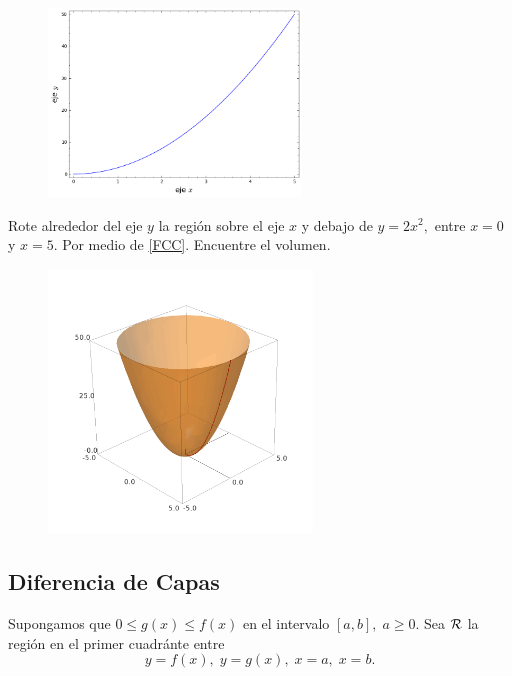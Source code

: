 \begin{problema}
\begin{figure}
 \centering
 \includegraphics[height=5cm,keepaspectratio=true]{./calculo/sage0505.png}
 \label{fig:sage:0505}
\end{figure}

Rote alrededor del eje $y$ la regi\'on sobre el eje $x$ y debajo de $y=2x^{2},$ entre $x=0$ y $x=5.$ Por medio de \eqref{FCC}. Encuentre el volumen.
\end{problema}



\begin{figure}
 \centering
 \includegraphics[height=7cm,keepaspectratio=true]{./calculo/sage0506.png}
 \label{fig:sage:0506}
\end{figure}



\subsection{Diferencia de Capas}


Supongamos que $0\leq g(x) \leq f(x)$ en el intervalo $[a,b], \; a \geq 0.$ Sea $\mathcal{R}$ la regi\'on en el primer cuadránte entre $$y=f(x), \; y=g(x), \; x=a, \; x=b.$$ 

